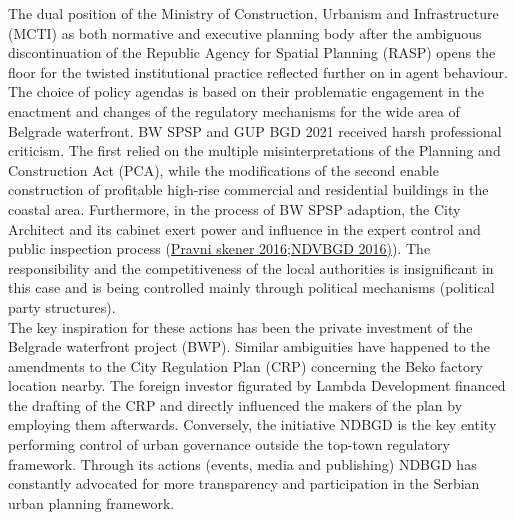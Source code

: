 \documentclass[11pt]{report}
\begin{document}
{{{{The dual position of the Ministry of Construction, Urbanism and Infrastructure (MCTI) as both normative and executive planning body after the ambiguous discontinuation of the Republic Agency for Spatial Planning (RASP) opens the floor for the twisted institutional practice reflected further on in agent behaviour. The choice of policy agendas is based on their problematic engagement in the enactment and changes of the regulatory mechanisms for the wide area of Belgrade waterfront. BW SPSP and GUP BGD 2021 received harsh professional criticism. The first relied on the multiple misinterpretations of the Planning and Construction Act (PCA), while the modifications of the second enable construction of profitable high-rise commercial and residential buildings in the coastal area. Furthermore, in the process of BW SPSP adaption, the City Architect and its cabinet exert power and influence in the expert control and public inspection process (\href{Pravni skener}{Pravni skener 2016};\href{NDVBGD}{NDVBGD 2016)}).
The responsibility and the competitiveness of the local authorities is insignificant in this case and is being controlled mainly through political mechanisms (political party structures). 
\\

The key inspiration for these actions has been the private investment of the Belgrade waterfront project (BWP). Similar ambiguities have happened to the amendments to the City Regulation Plan (CRP) concerning the Beko factory location nearby. The foreign investor figurated by Lambda Development financed the drafting of the CRP and directly influenced the makers of the plan by employing them afterwards. Conversely, the initiative NDBGD is the key entity performing control of urban governance outside the top-town regulatory framework. Through its actions (events, media and publishing) NDBGD has constantly advocated for more transparency and participation in the Serbian urban planning framework.
\\

}}}}
\end{document}
